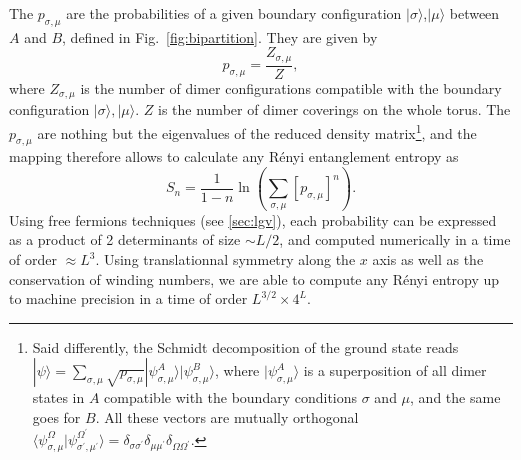 \documentclass[11pt]{iopart}
\newcommand{\psm}{p_{\sigma,\mu}}
\begin{document}
The $p_{\sigma,\mu}$ are the probabilities of a given boundary configuration $|\sigma\rangle$,$|\mu\rangle$ between $A$ and $B$, defined in Fig.~\ref{fig:bipartition}. They are given by
\begin{equation}
 \psm=\frac{Z_{\sigma,\mu}}{Z},
\end{equation}
where $Z_{\sigma,\mu}$ is the number of dimer configurations compatible with the boundary configuration $|\sigma\rangle,|\mu\rangle$. $Z$ is the number of dimer coverings on the whole torus. The $\psm$ are nothing but the eigenvalues of the reduced density matrix\footnote{Said differently, the Schmidt decomposition of the ground state reads $|\psi\rangle=\sum_{
\sigma,\mu} \sqrt{p_{\sigma,\mu}}|\psi_{\sigma,\mu}^A\rangle |\psi_{\sigma,\mu}^B\rangle$, where $|\psi_{\sigma,\mu}^A\rangle$ is a superposition of all dimer states in $A$ compatible with the boundary conditions $\sigma$ and $\mu$, and the same goes for $B$. All these vectors are mutually orthogonal $\langle \psi_{\sigma,\mu}^\Omega|\psi_{\sigma^\prime,\mu^\prime}^{\Omega^\prime}\rangle=\delta_{\sigma \sigma^\prime}\delta_{\mu \mu^\prime}\delta_{\Omega \Omega^\prime}$.}, and the mapping therefore allows to calculate  any R\'enyi entanglement entropy as
\begin{equation}
 S_n=\frac{1}{1-n}\ln \left(\sum_{\sigma,\mu}[\psm]^n\right).
\end{equation}
Using free fermions techniques (see \ref{sec:lgv}), each probability can be expressed as a product of 2 determinants of size $\sim L/2$, and computed numerically in a time of order $\approx L^3$. Using translationnal symmetry along the $x$ axis as well as the conservation of winding numbers, we are able to compute any R\'enyi entropy up to machine precision in a time of order $L^{3/2}\times 4^L$.
\end{document}
